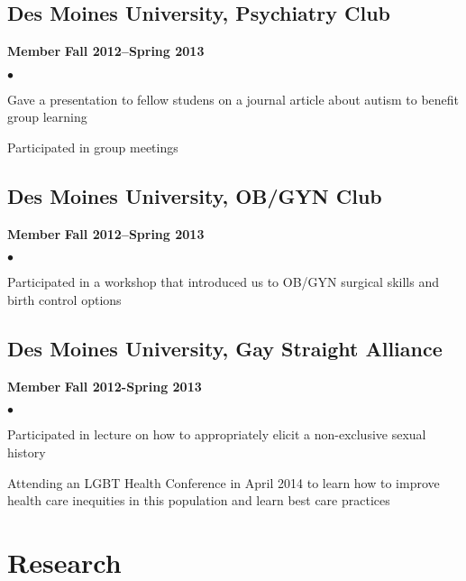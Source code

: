 \documentclass[10pt,letterpaper]{article}
\renewenvironment{itemize}{
  \begin{list}{}{
      \setlength{\leftmargin}{1.5em}
      \setlength{\itemsep}{0.25em}
      \setlength{\parskip}{0pt}
      \setlength{\parsep}{0.25em}
    }
  }{
  \end{list}
}
\newenvironment{bitemize}{
  \begin{list}{$\bullet$}{
      \setlength{\leftmargin}{1.5em}
      \setlength{\itemsep}{0.25em}
      \setlength{\parskip}{0pt}
      \setlength{\parsep}{0.25em}
    }
  }{
  \end{list}
}
\newcommand{\yearrange}[1]{\hfill \textbf{#1} \par}
\begin{document}
\subsection*{Des Moines University, Psychiatry Club}
\begin{itemize}
\item \textbf{Member} \yearrange{Fall 2012--Spring 2013}
  \begin{bitemize}
  \item Gave a presentation to fellow studens on a journal article about autism to benefit group learning
  \item Participated in group meetings
   \end{bitemize}
\end{itemize}

\subsection*{Des Moines University, OB/GYN Club}
\begin{itemize}
\item \textbf{Member} \yearrange{Fall 2012--Spring 2013}
  \begin{bitemize}
  \item Participated in a workshop that introduced us to OB/GYN surgical
  skills and birth control options
    \end{bitemize}
\end{itemize}

\subsection*{Des Moines University, Gay Straight Alliance}
\begin{itemize}
\item \textbf{Member} \yearrange{Fall 2012-Spring 2013}
  \begin{bitemize} 
 \item Participated in lecture on how to appropriately elicit a non-exclusive sexual history
 \item Attending an LGBT Health Conference in April 2014 to learn how to improve health care inequities in this population and learn best care practices 
  \end{bitemize}
\end{itemize}


\section*{Research}
\end{document}
